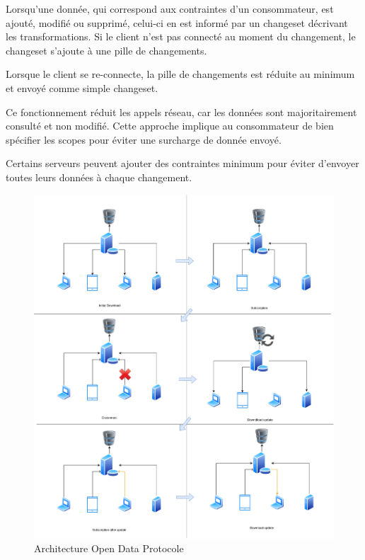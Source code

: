 Lorsqu'une donnée, qui correspond aux contraintes d'un consommateur, est ajouté, modifié ou supprimé,
celui-ci en est informé par un changeset décrivant les transformations.
Si le client n'est pas connecté au moment du changement, le changeset s'ajoute à une pille
de changements.

Lorsque le client se re-connecte, la pille de changements est réduite au minimum et envoyé
comme simple changeset.

Ce fonctionnement réduit les appels réseau, car les données sont majoritairement consulté et non modifié.
Cette approche implique au consommateur de bien spécifier les scopes pour éviter une surcharge de donnée
envoyé.

Certains serveurs peuvent ajouter des contraintes minimum pour éviter d'envoyer toutes leurs données
à chaque changement.

\begin{figure}[h!]
  \centering
  \includegraphics[scale=0.19]{media/open_data_protocol.png}
  \caption{Architecture Open Data Protocole}
\end{figure}




